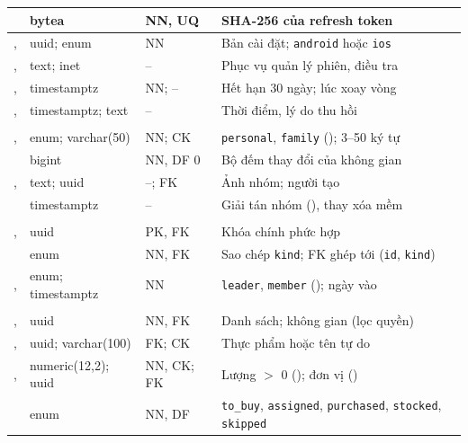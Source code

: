{\begin{longtable}{|L{4.85cm}|L{2.5cm}|L{1.6cm}|L{\dimexpr{}\arrayrulewidth-4.85cm-2.5cm-1.6cm\relax}|}
 & bytea & NN, UQ & SHA-256 của refresh token\\ \hline
{},  & uuid; enum & NN & Bản cài đặt; \texttt{android} hoặc \texttt{ios}\\ \hline
{},  & text; inet & -- & Phục vụ quản lý phiên, điều tra\\ \hline
{},  & timestamptz & NN; -- & Hết hạn 30 ngày; lúc xoay vòng\\ \hline
{},  & timestamptz; text & -- & Thời điểm, lý do thu hồi\\ \hline
{}\\ \hline
{},  & enum; varchar(50) & NN; CK & \texttt{personal}, \texttt{family} (); 3--50 ký tự\\ \hline
{} & bigint & NN, DF 0 & Bộ đếm thay đổi của không gian\\ \hline
{},  & text; uuid & --; FK & Ảnh nhóm; người tạo\\ \hline
{} & timestamptz & -- & Giải tán nhóm (), thay xóa mềm\\ \hline
{}\\ \hline
{},  & uuid & PK, FK & Khóa chính phức hợp\\ \hline
{} & enum & NN, FK & Sao chép \texttt{kind}; FK ghép tới (\texttt{id}, \texttt{kind})\\ \hline
{},  & enum; timestamptz & NN & \texttt{leader}, \texttt{member} (); ngày vào\\ \hline
{}\\ \hline
{},  & uuid & NN, FK & Danh sách; không gian (lọc quyền)\\ \hline
{},  & uuid; varchar(100) & FK; CK & Thực phẩm hoặc tên tự do\\ \hline
{},  & numeric(12,2); uuid & NN, CK; FK & Lượng $>$ 0 (); đơn vị ()\\ \hline
{} & enum & NN, DF & \texttt{to\_buy}, \texttt{assigned}, \texttt{purchased}, \texttt{stocked}, \texttt{skipped}\\ \hline

\end{longtable}}
